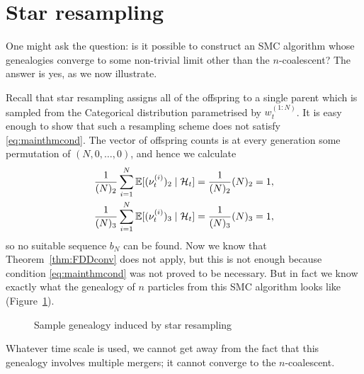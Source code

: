 %
%
%
%




\section{Star resampling}
One might ask the question: is it possible to construct an SMC algorithm whose genealogies converge to some non-trivial limit other than the $n$-coalescent?
The answer is yes, as we now illustrate.

Recall that star resampling assigns all of the offspring to a single parent which is sampled from the Categorical distribution parametrised by $w_t^{(1:N)}$.
It is easy enough to show that such a resampling scheme does not satisfy \eqref{eq:mainthmcond}.
The vector of offspring counts is at every generation some permutation of $(N,0,\dots,0)$, and hence we calculate
\begin{align*}
\frac{1}{(N)_2} \sum_{i=1}^N \mathbb{E}[ (\nu_t^{(i)})_2 \mid \mathcal{H}_t ]
&= \frac{1}{(N)_2} (N)_2 = 1 , \\
\frac{1}{(N)_3} \sum_{i=1}^N \mathbb{E}[ (\nu_t^{(i)})_3 \mid \mathcal{H}_t ]
&= \frac{1}{(N)_3} (N)_3 = 1 ,
\end{align*}
so no suitable sequence $b_N$ can be found.
Now we know that Theorem~\ref{thm:FDDconv} does not apply, but this is not enough because condition \eqref{eq:mainthmcond} was not proved to be necessary.
But in fact we know exactly what the genealogy of $n$ particles from this SMC algorithm looks like (Figure~\ref{fig:star_genealogy}).
\begin{figure}[ht]
\centering
{}
\caption{Sample genealogy induced by star resampling}
\label{fig:star_genealogy}
\end{figure}
Whatever time scale is used, we cannot get away from the fact that this genealogy involves multiple mergers; it cannot converge to the $n$-coalescent.

